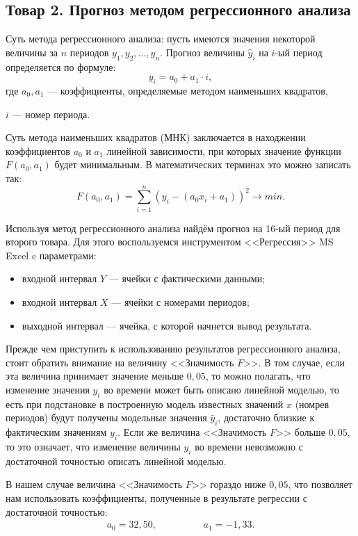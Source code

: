 \subsection{Товар 2. Прогноз методом регрессионного анализа}

Суть метода регрессионного анализа: пусть имеются значения некоторой
величины за $n$ периодов $y_1, y_2, \dots, y_n$.
Прогноз величины $\hat{y}_{i}$ на $i$-ый период определяется по формуле:
\[
  y_{i} = a_0 + a_1 \cdot i,
\]
где \hspace{2mm} $a_0, a_1$ --- коэффициенты, определяемые методом наименьших квадратов, \par 
                 $i$ --- номер периода.

Суть метода наименьших квадратов (МНК) заключается в находжении
коэффициентов $a_0$ и $a_1$ линейной зависимости, при которых
значение функции $F(a_0, a_1)$ будет минимальным. В математических
терминах это можно записать так:
\[
  F(a_0, a_1) = \sum_{i=1}^{n} (y_i - (a_0 x_i + a_1))^2 \rightarrow min.
\]

Используя метод регрессионного анализа найдём прогноз на 16-ый период
для второго товара. Для этого воспользуемся инструментом
<<Регрессия>> MS Excel c параметрами:
\begin{itemize}
  \item входной интервал $Y$ --- ячейки с фактическими данными;
  \item входной интервал $X$ --- ячейки с номерами периодов;
  \item выходной интервал --- ячейка, с которой начнется вывод результата.
\end{itemize}

Прежде чем приступить к использованию результатов регрессионного анализа,
стоит обратить внимание на величину <<Значимость $F$>>. В том случае, если
эта величина принимает значение меньше $0{,}05$, то можно полагать, что
изменение значения $y_i$ во времени может быть описано линейной моделью, то
есть при подстановке в построенную модель известных значений $x$ (номрев периодов)
будут получены модельные значения $\hat{y}_i$, достаточно близкие к фактическим
значениям $y_i$. Если же величина <<Значимость $F$>> больше $0{,}05$, то
это означает, что изменение величины $y_i$ во времени невозможно с достаточной
точностью описать линейной моделью.

В нашем случае величина <<Значимость $F$>> гораздо ниже $0,05$, что позволяет
нам использовать коэффициенты, полученные в результате регрессии с достаточной точностью:
\begin{align*}
  a_0 = 32{,}50, \hspace{2cm} a_1 = - 1{,}33. 
\end{align*}

